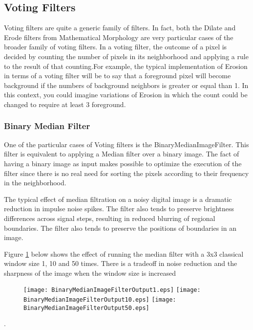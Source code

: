 \ifitkFullVersion

\fi


\subsection{Voting Filters}
\label{sec:VotingFilters}

Voting filters are quite a generic family of filters. In fact, both the Dilate
and Erode filters from Mathematical Morphology are very particular cases of the
broader family of voting filters. In a voting filter, the outcome of a pixel is
decided by counting the number of pixels in its neighborhood and applying a
rule to the result of that counting.For example, the typical implementation of
Erosion in terms of a voting filter will be to say that a foreground pixel will
become background if the numbers of background neighbors is greater or equal
than 1. In this context, you could imagine variations of Erosion in which the
count could be changed to require at least 3 foreground.

\subsubsection{Binary Median Filter}

One of the particular cases of Voting filters is the BinaryMedianImageFilter.
This filter is equivalent to applying a Median filter over a binary image. The
fact of having a binary image as input makes possible to optimize the execution
of the filter since there is no real need for sorting the pixels according to
their frequency in the neighborhood.

\ifitkFullVersion

\fi

The typical effect of median filtration on a noisy digital image is a dramatic reduction in impulse noise spikes. The filter also tends to preserve brightness differences across signal steps, resulting in reduced blurring of regional boundaries. The filter also tends to preserve the positions of boundaries in an image.

Figure \ref{fig:BinaryMedianImageFilterOutputMultipleIterations} below shows the effect of running the median filter with a 3x3 classical window size 
1, 10 and 50 times. There is a tradeoff in noise reduction and the sharpness of the image when the window size is increased\begin{figure}
  \center
  \texttt{[image: BinaryMedianImageFilterOutput1.eps]}
  \texttt{[image: BinaryMedianImageFilterOutput10.eps]}
  \texttt{[image: BinaryMedianImageFilterOutput50.eps]}
  \label{fig:BinaryMedianImageFilterOutputMultipleIterations}
\end{figure}.


